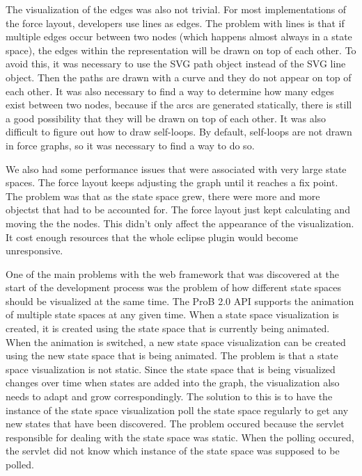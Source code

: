 The visualization of the edges was also not trivial. For most implementations of the force layout, developers use lines as edges. The problem with lines is that if multiple edges occur between two nodes (which happens almost always in a state space), the edges within the representation will be drawn on top of each other. To avoid this, it was necessary to use the SVG path object instead of the SVG line object. Then the paths are drawn with a curve and they do not appear on top of each other. It was also necessary to find a way to determine how many edges exist between two nodes, because if the arcs are generated statically, there is still a good possibility that they will be drawn on top of each other. It was also difficult to figure out how to draw self-loops. By default, self-loops are not drawn in force graphs, so it was necessary to find a way to do so.

We also had some performance issues that were associated with very large state spaces. The force layout keeps adjusting the graph until it reaches a fix point. The problem was that as the state space grew, there were more and more objectst that had to be accounted for. The force layout just kept calculating and moving the the nodes. This didn't only affect the appearance of the visualization. It cost enough resources that the whole eclipse plugin would become unresponsive.

One of the main problems with the web framework that was discovered at the start of the development process was the problem of how different state spaces should be visualized at the same time. The ProB 2.0 API supports the animation of multiple state spaces at any given time. When a state space visualization is created, it is created using the state space that is currently being animated. When the animation is switched, a new state space visualization can be created using the new state space that is being animated. The problem is that a state space visualization is not static. Since the state space that is being visualized changes over time when states are added into the graph, the visualization also needs to adapt and grow correspondingly. The solution to this is to have the instance of the state space visualization poll the state space regularly to get any new states that have been discovered. The problem occured because the servlet responsible for dealing with the state space was static. When the polling occured, the servlet did not know which instance of the state space was supposed to be polled.


